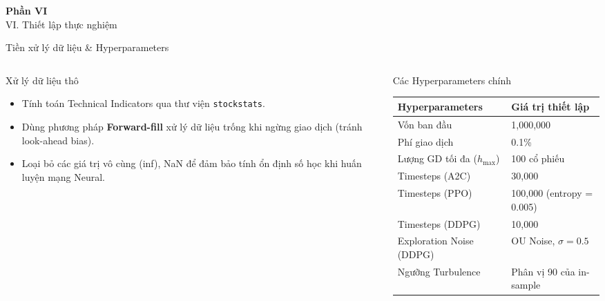 \documentclass[10pt,aspectratio=169]{beamer}
\begin{document}
\begin{frame}[plain,c]
  \color{white}
  \centering
  \Huge \textbf{Phần VI}\\
  \vspace{0.5cm}
  \Large \color{secondary} VI. Thiết lập thực nghiệm
\end{frame}

\begin{frame}{Tiền xử lý dữ liệu \& Hyperparameters}
  \begin{columns}
    \begin{column}{0.5\textwidth}
      \begin{block}{Xử lý dữ liệu thô}
        \begin{itemize}
          \item Tính toán Technical Indicators qua thư viện \texttt{stockstats}.
          \item Dùng phương pháp \textbf{Forward-fill} xử lý dữ liệu trống khi ngừng giao dịch (tránh look-ahead bias).
          \item Loại bỏ các giá trị vô cùng (inf), NaN để đảm bảo tính ổn định số học khi huấn luyện mạng Neural.
        \end{itemize}
      \end{block}
    \end{column}
    
    \begin{column}{0.48\textwidth}
      \begin{block}{Các Hyperparameters chính}
        \centering
        \scriptsize
        \begin{tabular}{ll}
          \toprule
          \textbf{Hyperparameters} & \textbf{Giá trị thiết lập} \\
          \midrule
          Vốn ban đầu & 1,000,000 \\
          Phí giao dịch & 0.1\% \\
          Lượng GD tối đa ($h_{\max}$) & 100 cổ phiếu \\
          Timesteps (A2C) & 30,000 \\
          Timesteps (PPO) & 100,000 (entropy = 0.005) \\
          Timesteps (DDPG) & 10,000 \\
          Exploration Noise (DDPG) & OU Noise, $\sigma = 0.5$ \\
          Ngưỡng Turbulence & Phân vị 90 của in-sample \\
          \bottomrule
        \end{tabular}
      \end{block}
    \end{column}
  \end{columns}
\end{frame}
\end{document}
